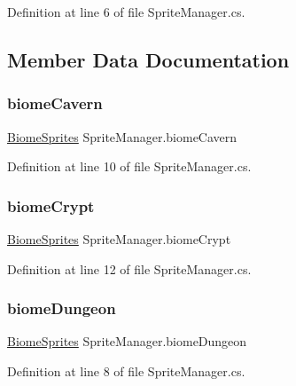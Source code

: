 Definition at line 6 of file Sprite\+Manager.\+cs.



\subsection{Member Data Documentation}
\mbox{\label{class_sprite_manager_a59bc7917142934092c7b3888451dd9e4}} 
\subsubsection{\texorpdfstring{biomeCavern}{biomeCavern}}
{\footnotesize\ttfamily \mbox{\hyperlink{class_biome_sprites}{Biome\+Sprites}} Sprite\+Manager.\+biome\+Cavern}



Definition at line 10 of file Sprite\+Manager.\+cs.

\mbox{\label{class_sprite_manager_a5b6ce80cce6056259bef0eaae96437b8}} 
\subsubsection{\texorpdfstring{biomeCrypt}{biomeCrypt}}
{\footnotesize\ttfamily \mbox{\hyperlink{class_biome_sprites}{Biome\+Sprites}} Sprite\+Manager.\+biome\+Crypt}



Definition at line 12 of file Sprite\+Manager.\+cs.

\mbox{\label{class_sprite_manager_a5609d24117047d07f812720312e89bcc}} 
\subsubsection{\texorpdfstring{biomeDungeon}{biomeDungeon}}
{\footnotesize\ttfamily \mbox{\hyperlink{class_biome_sprites}{Biome\+Sprites}} Sprite\+Manager.\+biome\+Dungeon}



Definition at line 8 of file Sprite\+Manager.\+cs.

